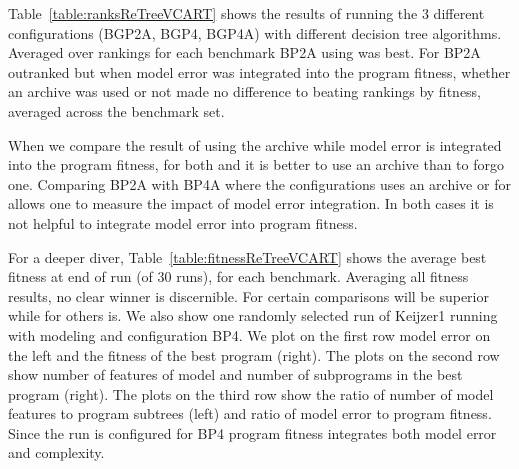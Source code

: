 Table~\ref{table:ranksReTreeVCART} shows the results of running the 3 different configurations (BGP2A, BGP4, BGP4A) with different decision tree algorithms.  Averaged over rankings for each benchmark  BP2A using \REPTREE was best. For BP2A \REPTREE outranked \SCIKIT but when model error was integrated into the program fitness, whether an archive was used or not made no difference to \SCIKIT beating \REPTREE  rankings by fitness, averaged across the benchmark set.  

When we compare the result of using the archive while model error is integrated into the program fitness, for both \REPTREE and \SCIKIT it is better to use an archive than to forgo one.  Comparing BP2A with BP4A where the configurations uses an archive \SCIKIT or for \REPTREE allows one to measure the impact of model error integration.  In both cases it is not helpful to integrate model error into program fitness. 

For a deeper diver, Table~\ref{table:fitnessReTreeVCART} shows the average best fitness at end of run (of 30 runs), for each benchmark.   Averaging all fitness results, no clear winner is  discernible. For certain comparisons \SCIKIT will be superior while for others \REPTREE is.   We also show one randomly selected run of Keijzer1 running with \REPTREE modeling and configuration BP4.   We plot on the first row  model error on the left and the fitness of the best program (right).  The plots on the second row show number of features of model  and number of subprograms in the best program (right). The plots on the third row show the ratio of number of model features to program subtrees (left) and ratio of model error to program fitness. Since the run is configured for  BP4 program fitness integrates both model error and complexity.  



